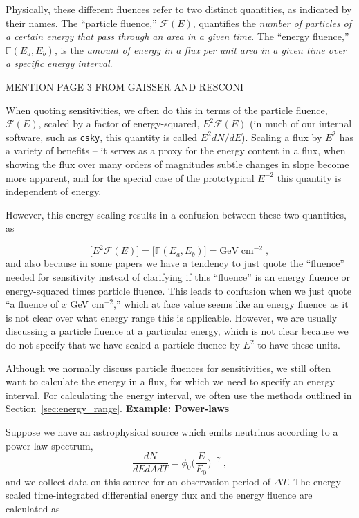 \documentclass[a4paper,11pt]{article}
\begin{document}
Physically, these different fluences refer to two distinct quantities, as indicated by their names. The ``particle fluence,'' $\mathcal{F}(E)$, quantifies the \textit{number of particles of a certain energy that pass through an area in a given time}. The ``energy fluence,'' $\mathbb{F}(E_a, E_b)$, is the \textit{amount of energy in a flux per unit area in a given time over a specific energy interval}.

MENTION PAGE 3 FROM GAISSER AND RESCONI

When quoting sensitivities, we often do this in terms of the particle fluence, $\mathcal{F}(E)$, scaled by a factor of energy-squared, $E^2\mathcal{F}(E)$ (in much of our internal software, such as \texttt{csky}, this quantity is called $E^2dN/dE$). Scaling a flux by $E^2$ has a variety of benefits -- it serves as a proxy for the energy content in a flux, when showing the flux over many orders of magnitudes subtle changes in slope become more apparent, and for the special case of the prototypical $E^{-2}$ this quantity is independent of energy.

However, this energy scaling results in a confusion between these two quantities, as

\begin{equation}
    \big[E^2\mathcal{F}(E)\big] = \big[\mathbb{F}(E_a, E_b)\big] = \mathrm{GeV}\;\mathrm{cm}^{-2}\;,
\end{equation}
and also because in some papers we have a tendency to just quote the ``fluence'' needed for sensitivity instead of clarifying if this ``fluence'' is an energy fluence or energy-squared times particle fluence. This leads to confusion when we just quote ``a fluence of $x$ GeV cm$^{-2}$,'' which at face value seems like an energy fluence as it is not clear over what energy range this is applicable. However, we are usually discussing a particle fluence at a particular energy, which is not clear because we do not specify that we have scaled a particle fluence by $E^2$ to have these units.

Although we normally discuss particle fluences for sensitivities, we still often want to calculate the energy in a flux, for which we need to specify an energy interval. For calculating the energy interval, we often use the methods outlined in Section~\ref{sec:energy_range}.
\newline
\textbf{Example: Power-laws}

Suppose we have an astrophysical source which emits neutrinos according to a power-law spectrum, 
\begin{equation}
    \frac{dN}{dEdAdT}= \phi_0 \Big(\frac{E}{E_0}\Big)^{-\gamma} \; ,
\end{equation}
and we collect data on this source for an observation period of $\Delta T$. The energy-scaled time-integrated differential energy flux and the energy fluence are calculated as 
\end{document}
